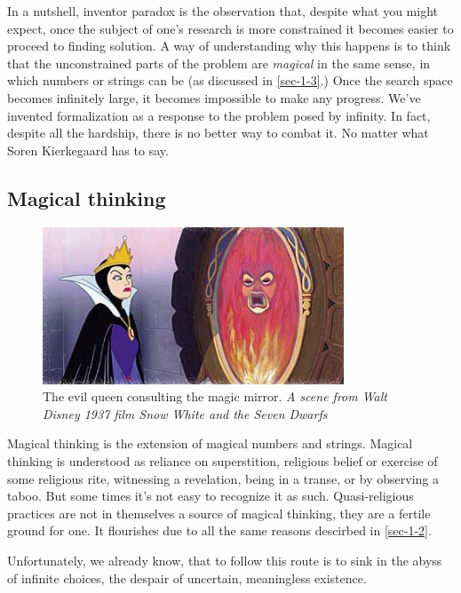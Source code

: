 \documentclass[11pt]{article}
\begin{document}
In a nutshell, inventor paradox is the observation that, despite what you
might expect, once the subject of one's research is more constrained it
becomes easier to proceed to finding solution.  A way of understanding why
this happens is to think that the unconstrained parts of the problem are
\emph{magical} in the same sense, in which numbers or strings can be (as discussed
in \ref{sec-1-3}.)  Once the search space becomes infinitely large, it
becomes impossible to make any progress.  We've invented formalization as a
response to the problem posed by infinity.  In fact, despite all the
hardship, there is no better way to combat it.  No matter what Soren
Kierkegaard has to say.
\subsection{Magical thinking}
\label{sec-1-5}

\begin{figure}[h!]
  \centering
  \includegraphics[width=0.8\textwidth]{./queen.jpg}
  \caption[Mirror, mirror on the wall...]{
    \ssmall The evil queen consulting the magic mirror.
    \textit{A scene from Walt Disney 1937 film 
      Snow White and the Seven Dwarfs}}
\end{figure}

Magical thinking is the extension of magical numbers and strings.  Magical
thinking is understood as reliance on superstition, religious belief or
exercise of some religious rite, witnessing a revelation, being in a transe,
or by observing a taboo.  But some times it's not easy to recognize it as
such.  Quasi-religious practices are not in themselves a source of magical
thinking, they are a fertile ground for one.  It flourishes due to all the
same reasons descirbed in \ref{sec-1-2}.

Unfortunately, we already know, that to follow this route is to sink in the
abyss of infinite choices, the despair of uncertain, meaningless existence.
\end{document}
